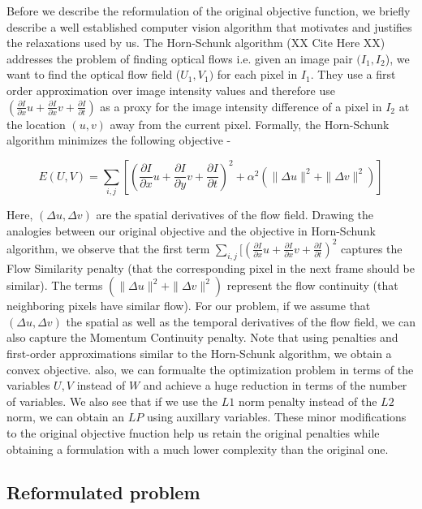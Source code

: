 Before we describe the reformulation of the original objective function,
we briefly describe a well established computer vision algorithm that
motivates and justifies the relaxations used by us. The Horn-Schunk
algorithm (XX Cite Here XX) addresses the problem of finding optical
flows i.e. given an image pair $(I_{1},I_{2}$), we want to find the
optical flow field ($U_{1},V_{1})$ for each pixel in $I_{1}$. They
use a first order approximation over image intensity values and therefore
use $(\frac{\partial I}{\partial x}u+\frac{\partial I}{\partial x}v+\frac{\partial I}{\partial t})$
as a proxy for the image intensity difference of a pixel in $I_{2}$
at the location $(u,v)$ away from the current pixel. Formally, the
Horn-Schunk algorithm minimizes the following objective -

\begin{equation}
E(U,V)=\underset{i,j}{\sum}[(\frac{\partial I}{\partial x}u+\frac{\partial I}{\partial y}v+\frac{\partial I}{\partial t})^{2}+\alpha^{2}(\|\Delta u\|^{2}+\|\Delta v\|^{2})]
\end{equation}


Here, $(\Delta u,\Delta v)$ are the spatial derivatives of the flow
field. Drawing the analogies between our original objective and the
objective in Horn-Schunk algorithm, we observe that the first term
$\underset{i,j}{\sum}[(\frac{\partial I}{\partial x}u+\frac{\partial I}{\partial x}v+\frac{\partial I}{\partial t})^{2}$
captures the Flow Similarity penalty (that the corresponding pixel
in the next frame should be similar). The terms $ $$(\|\Delta u\|^{2}+\|\Delta v\|^{2})$
represent the flow continuity (that neighboring pixels have similar
flow). For our problem, if we assume that $(\Delta u,\Delta v)$ the
spatial as well as the temporal derivatives of the flow field, we
can also capture the Momentum Continuity penalty. Note that using
penalties and first-order approximations similar to the Horn-Schunk
algorithm, we obtain a convex objective. also, we can formualte the
optimization problem in terms of the variables $U,V$ instead of $W$
and achieve a huge reduction in terms of the number of variables.
We also see that if we use the $L1$ norm penalty instead of the $L2$
norm, we can obtain an $LP$ using auxillary variables. These minor
modifications to the original objective fnuction help us retain the
original penalties while obtaining a formulation with a much lower
complexity than the original one.


\subsection{Reformulated problem}

